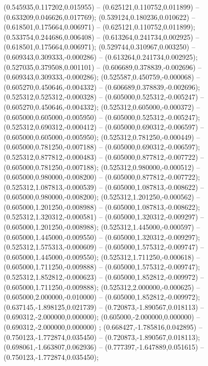  (0.545935,0.117202,0.015955) -- (0.625121,0.110752,0.011899) -- (0.633209,0.046626,0.017769);
 (0.539124,0.180236,0.010622) -- (0.618501,0.175664,0.006971) -- (0.625121,0.110752,0.011899);
 (0.533754,0.244686,0.006408) -- (0.613264,0.241734,0.002925) -- (0.618501,0.175664,0.006971);
 (0.529744,0.310967,0.003250) -- (0.609343,0.309333,-0.000286) -- (0.613264,0.241734,0.002925);
 (0.527035,0.379508,0.001101) -- (0.606689,0.378839,-0.002696) -- (0.609343,0.309333,-0.000286);
 (0.525587,0.450759,-0.000068) -- (0.605270,0.450646,-0.004332) -- (0.606689,0.378839,-0.002696);
 (0.525312,0.525312,-0.000328) -- (0.605000,0.525312,-0.005247) -- (0.605270,0.450646,-0.004332);
 (0.525312,0.605000,-0.000372) -- (0.605000,0.605000,-0.005950) -- (0.605000,0.525312,-0.005247);
 (0.525312,0.690312,-0.000412) -- (0.605000,0.690312,-0.006597) -- (0.605000,0.605000,-0.005950);
 (0.525312,0.781250,-0.000449) -- (0.605000,0.781250,-0.007188) -- (0.605000,0.690312,-0.006597);
 (0.525312,0.877812,-0.000483) -- (0.605000,0.877812,-0.007722) -- (0.605000,0.781250,-0.007188);
 (0.525312,0.980000,-0.000512) -- (0.605000,0.980000,-0.008200) -- (0.605000,0.877812,-0.007722);
 (0.525312,1.087813,-0.000539) -- (0.605000,1.087813,-0.008622) -- (0.605000,0.980000,-0.008200);
 (0.525312,1.201250,-0.000562) -- (0.605000,1.201250,-0.008988) -- (0.605000,1.087813,-0.008622);
 (0.525312,1.320312,-0.000581) -- (0.605000,1.320312,-0.009297) -- (0.605000,1.201250,-0.008988);
 (0.525312,1.445000,-0.000597) -- (0.605000,1.445000,-0.009550) -- (0.605000,1.320312,-0.009297);
 (0.525312,1.575313,-0.000609) -- (0.605000,1.575312,-0.009747) -- (0.605000,1.445000,-0.009550);
 (0.525312,1.711250,-0.000618) -- (0.605000,1.711250,-0.009888) -- (0.605000,1.575312,-0.009747);
 (0.525312,1.852812,-0.000623) -- (0.605000,1.852812,-0.009972) -- (0.605000,1.711250,-0.009888);
 (0.525312,2.000000,-0.000625) -- (0.605000,2.000000,-0.010000) -- (0.605000,1.852812,-0.009972);
 (0.637145,-1.898125,0.021739) -- (0.720873,-1.890567,0.018113) -- (0.690312,-2.000000,0.000000);
 (0.605000,-2.000000,0.000000) -- (0.690312,-2.000000,0.000000) ;
 (0.668427,-1.785816,0.042895) -- (0.750123,-1.772874,0.035450) -- (0.720873,-1.890567,0.018113);
 (0.698061,-1.663807,0.062936) -- (0.777397,-1.647889,0.051615) -- (0.750123,-1.772874,0.035450);
